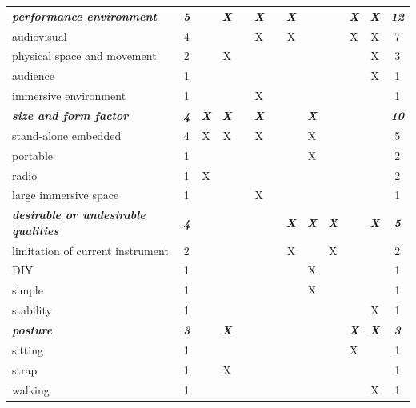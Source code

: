 \documentclass[letterpaper, 12pt]{article}
\begin{document}
\begin{spacing}{1.1}
\begin{supertabular}{L{5.5cm}cccccccccccc}
        \emph{\textbf{performance environment}} & \emph{\textbf{5}} & & \emph{\textbf{X}} & & \emph{\textbf{X}} & & \emph{\textbf{X}} & & & \emph{\textbf{X}} & \emph{\textbf{X}} & \emph{\textbf{12}} \\
        audiovisual                      & 4  &   &   &   & X &   & X &   &   & X & X & 7  \\
        physical space and movement     & 2  &   & X &   &   &   &   &   &   &   & X & 3  \\
        audience                         & 1  &   &   &   &   &   &   &   &   &   & X & 1  \\
        immersive environment            & 1  &   &   &   & X &   &   &   &   &   &   & 1  \\
        \hline
    
        \emph{\textbf{size and form factor}} & \emph{\textbf{4}} & \emph{\textbf{X}} & \emph{\textbf{X}} & & \emph{\textbf{X}} & & & \emph{\textbf{X}} & & & & \emph{\textbf{10}} \\
        stand-alone embedded             & 4  & X & X &   & X &   &   & X &   &   &   & 5  \\
        portable                         & 1  &   &   &   &   &   &   & X &   &   &   & 2  \\
        radio                            & 1  & X &   &   &   &   &   &   &   &   &   & 2  \\
        large immersive space            & 1  &   &   &   & X &   &   &   &   &   &   & 1  \\
        \hline
    
        \emph{\textbf{desirable or undesirable qualities}} & \emph{\textbf{4}} & & & & & & \emph{\textbf{X}} & \emph{\textbf{X}} & \emph{\textbf{X}} & & \emph{\textbf{X}} & \emph{\textbf{5}} \\
        limitation of current instrument & 2  &   &   &   &   &   & X &   & X &   &   & 2  \\ 
        DIY                              & 1  &   &   &   &   &   &   & X &   &   &   & 1  \\
        simple                           & 1  &   &   &   &   &   &   & X &   &   &   & 1  \\
        stability                        & 1  &   &   &   &   &   &   &   &   &   & X & 1  \\
        \hline
    
        \emph{\textbf{posture}} & \emph{\textbf{3}} & & \emph{\textbf{X}} & & & & & & & \emph{\textbf{X}} & \emph{\textbf{X}} & \emph{\textbf{3}} \\
        sitting                          & 1  &   &   &   &   &   &   &   &   & X &   & 1  \\
        strap                            & 1  &   & X &   &   &   &   &   &   &   &   & 1  \\
        walking                          & 1  &   &   &   &   &   &   &   &   &   & X & 1  \\
        \hline
    

\end{supertabular}
\end{spacing}
\end{document}
